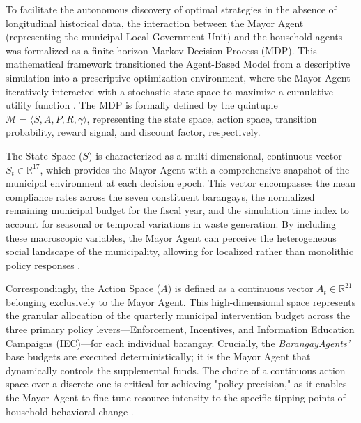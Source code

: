 To facilitate the autonomous discovery of optimal strategies in the absence of longitudinal historical data, the interaction between the Mayor Agent (representing the municipal Local Government Unit) and the household agents was formalized as a finite-horizon Markov Decision Process (MDP). This mathematical framework transitioned the Agent-Based Model from a descriptive simulation into a prescriptive optimization environment, where the Mayor Agent iteratively interacted with a stochastic state space to maximize a cumulative utility function \citep{Kompella2020}. The MDP is formally defined by the quintuple $\mathcal{M} = \langle S, A, P, R, \gamma \rangle$, representing the state space, action space, transition probability, reward signal, and discount factor, respectively.

The State Space ($S$) is characterized as a multi-dimensional, continuous vector $S_t \in \mathbb{R}^{17}$, which provides the Mayor Agent with a comprehensive snapshot of the municipal environment at each decision epoch. This vector encompasses the mean compliance rates across the seven constituent barangays, the normalized remaining municipal budget for the fiscal year, and the simulation time index to account for seasonal or temporal variations in waste generation. By including these macroscopic variables, the Mayor Agent can perceive the heterogeneous social landscape of the municipality, allowing for localized rather than monolithic policy responses \citep{HaMinh2025}. 

Correspondingly, the Action Space ($A$) is defined as a continuous vector $A_t \in \mathbb{R}^{21}$ belonging exclusively to the Mayor Agent. This high-dimensional space represents the granular allocation of the quarterly municipal intervention budget across the three primary policy levers—Enforcement, Incentives, and Information Education Campaigns (IEC)—for each individual barangay. Crucially, the \textit{BarangayAgents'} base budgets are executed deterministically; it is the Mayor Agent that dynamically controls the supplemental funds. The choice of a continuous action space over a discrete one is critical for achieving "policy precision," as it enables the Mayor Agent to fine-tune resource intensity to the specific tipping points of household behavioral change \citep{Rajesh2025}.

